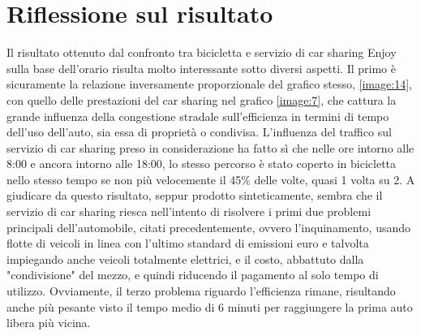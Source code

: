 \section{Riflessione sul risultato}

Il risultato ottenuto dal confronto tra bicicletta e servizio di car sharing Enjoy sulla base dell'orario risulta molto interessante sotto diversi aspetti. Il primo è sicuramente la relazione inversamente proporzionale del grafico stesso, \ref{image:14}, con quello delle prestazioni del car sharing nel grafico \ref{image:7}, che cattura la grande influenza della congestione stradale sull'efficienza in termini di tempo dell'uso dell'auto, sia essa di proprietà o condivisa. L'influenza del traffico sul servizio di car sharing preso in considerazione ha fatto sì che nelle ore intorno alle 8:00 e ancora intorno alle 18:00, lo stesso percorso è stato coperto in bicicletta nello stesso tempo se non più velocemente il 45\% delle volte, quasi 1 volta su 2. A giudicare da questo risultato, seppur prodotto sinteticamente, sembra che il servizio di car sharing riesca nell'intento di risolvere i primi due problemi principali dell'automobile, citati precedentemente, ovvero l'inquinamento, usando flotte di veicoli in linea con l'ultimo standard di emissioni euro e talvolta impiegando anche veicoli totalmente elettrici, e il costo, abbattuto dalla "condivisione" del mezzo, e quindi riducendo il pagamento al solo tempo di utilizzo. Ovviamente, il terzo problema riguardo l'efficienza rimane, risultando anche più pesante visto il tempo medio di 6 minuti per raggiungere la prima auto libera più vicina.

